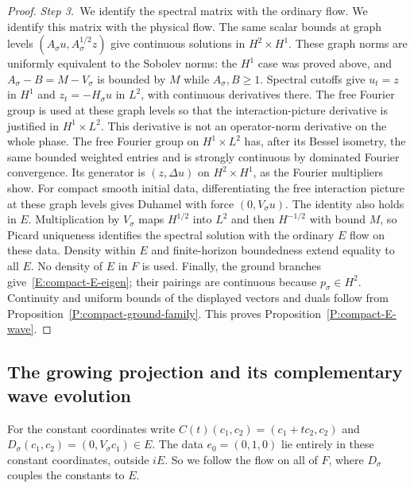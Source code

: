 \begin{proof}
  \medskip
  \noindent\textit{Step 3.~}We identify the spectral matrix with the ordinary
  flow.
  We identify this matrix with the physical flow. The same scalar bounds at
  graph levels $(A_\sigma u,A_\sigma^{1/2}z)$ give continuous solutions in
  $H^2\times H^1$. These graph norms are uniformly equivalent to the Sobolev
  norms: the $H^1$ case was proved above, and $A_\sigma-B = M-V_\sigma$ is
  bounded by $M$ while $A_\sigma,B \ge 1$. Spectral cutoffs give $u_t = z$ in
  $H^1$ and $z_t = -H_\sigma u$ in $L^2$, with continuous derivatives there.
  The
  free Fourier group is used at these graph levels so that the
  interaction-picture derivative is justified in $H^1\times L^2$. This
  derivative is not an operator-norm derivative on the whole phase. The
  free Fourier group on $H^1\times L^2$ has, after its Bessel isometry, the same
  bounded weighted entries and is strongly continuous by dominated Fourier
  convergence. Its generator is $(z,\Delta u)$ on $H^2\times H^1$, as the
  Fourier multipliers show. For compact smooth initial data, differentiating the
  free interaction picture at these graph levels gives Duhamel with force
  $(0,V_\sigma u)$. The identity also holds in $E$. Multiplication by $V_\sigma$
  maps $H^{1/2}$ into $L^2$ and then $H^{-1/2}$ with bound $M$, so Picard
  uniqueness identifies the spectral solution with the ordinary $E$ flow on
  these data. Density within $E$ and finite-horizon boundedness extend equality
  to all $E$. No density of $E$ in $F$ is used. Finally, the ground branches
  give~\eqref{E:compact-E-eigen}; their pairings are continuous because
  $p_\sigma \in H^2$. Continuity and uniform bounds of the displayed vectors and
  duals follow from Proposition~\ref{P:compact-ground-family}. This proves
  Proposition~\ref{P:compact-E-wave}.
\end{proof}

\subsection{The growing projection and its complementary wave evolution}

For the constant coordinates write $C(t)(c_1,c_2) = (c_1+tc_2,c_2)$ and
$D_\sigma(c_1,c_2) = (0,V_\sigma c_1) \in E$.
The data $e_0 = (0,1,0)$ lie entirely in these constant coordinates, outside
$iE$. So we follow the flow on all of $F$, where $D_\sigma$ couples the
constants to $E$.

